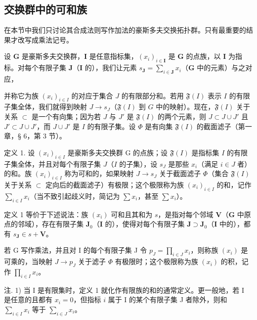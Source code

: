 \subsection{交换群中的可和族}

在本节中我们只讨论其合成法则写作加法的豪斯多夫交换拓扑群。只有最重要的结果才改写成乘法记号。

设 \(\mathbf{G}\) 是豪斯多夫交换群，\(\mathbf{I}\) 是任意指标集，\((x_{i})_{i\in \mathbf{I}}\) 是 \(\mathbf{G}\) 的点族，以 \(\mathbf{I}\) 为指标。对每个有限子集 \(\mathbf{J}\)（\(\mathbf{I}\) 的），我们让元素 \(s_{\mathbf{J}} = \sum_{i\in \mathbf{J}}x_i\)（\(\mathbf{G}\) 中的元素）与之对应，

并称它为族 \((x_{i})_{i\in I}\) 的对应于集合 \(J\) 的有限部分和。若用 \(\mathfrak{F}(I)\) 表示 \(I\) 的有限子集全体，我们就得到映射 \(J\to s_J\)（\(\mathfrak{F}(I)\) 到 \(G\) 中的映射）。现在，\(\mathfrak{F}(I)\) 关于关系 \(\subset\) 是一个有向集；因为若 \(J\) 与 \(J'\) 是 \(\mathfrak{F}(I)\) 的两个元素，则 \(J\subset J\cup J'\) 且 \(J'\subset J\cup J'\)，而 \(J\cup J'\) 是 \(I\) 的有限子集。设 \(\Phi\) 是有向集 \(\mathfrak{F}(I)\) 的截面滤子（第一章，§ 6，第 3 节）。

定义 1. 设 \((x_{i})_{i\in I}\) 是豪斯多夫交换群 G 的点族；设 \(\mathfrak{F}(I)\) 是指标集 \(I\) 的有限子集全体，并且对每个有限子集 \(J\)（\(I\) 的子集），设 \(s_J\) 是那些 \(x_{i}\)（满足 \(i\in J\) 者）的和。族 \((x_{i})_{i\in I}\) 称为可和的，如果映射 \(J\to s_J\) 关于截面滤子 \(\Phi\)（集合 \(\mathfrak{F}(I)\) 关于关系 \(\subset\) 定向后的截面滤子）有极限；这个极限称为族 \((x_{i})_{i\in I}\) 的和，记作 \(\sum_{i\in I}x_{i}\)（当不致引起歧义时，简记为 \(\sum x_{i}\)，甚至 \(\sum x_{i}\)）。

定义 1 等价于下述说法：族 \((x_{i})\) 可和且其和为 \(s\)，是指对每个邻域 \(\mathbf{V}\)（\(\mathbf{G}\) 中原点的邻域），存在有限子集 \(\mathbf{J}_0\)（\(\mathbf{I}\) 的），使得对每个有限子集 \(\mathbf{J} \supset \mathbf{J}_0\)（\(\mathbf{I}\) 中的），都有 \(s_{\mathbf{J}} \in s + \mathbf{V}\)。

若 G 写作乘法，并且对 I 的每个有限子集 J 令 \(p_{J} = \prod_{i \in J} x_i\)，则称族 \((x_i)\) 是可乘的，当映射 \(J \to p_J\) 关于滤子 \(\Phi\) 有极限时；这个极限称为族 \((x_i)\) 的积，记作 \(\prod_{i \in I} x_i\)。

注. 1) 当 I 是有限集时，定义 1 就化作有限族的和的通常定义。更一般地，若 I 是任意的且都有 \(x_{i} = 0\)，但指标 \(i\) 属于 I 的某个有限子集 J 者除外，则和 \(\sum_{i \in I} x_{i}\) 等于 \(\sum_{i \in J} x_{i}\)。

